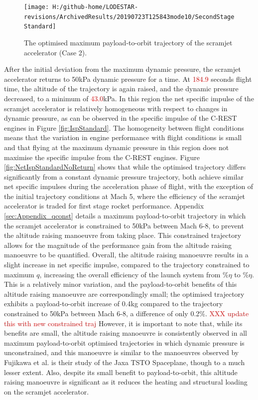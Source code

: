 \begin{figure}[ht!]%
\centering
\texttt{[image: H:/github-home/LODESTAR-revisions/ArchivedResults/20190723T125843mode10/SecondStageStandard]}
\caption{The optimised maximum payload-to-orbit trajectory of the scramjet accelerator (Case 2).}
\label{fig:SecondStageStandardNoReturn}
\end{figure}



After the initial deviation from the maximum dynamic pressure, the scramjet accelerator returns to 50kPa dynamic pressure for a time. 
At \textcolor{red}{184.9} seconds flight time, the altitude of the trajectory is again raised, and the dynamic pressure decreased, to a minimum of \textcolor{red}{43.0}kPa. In this region the net specific impulse of the scramjet accelerator is relatively homogeneous with respect to changes in dynamic pressure, as can be observed in the specific impulse of the C-REST engines in Figure \ref{fig:IspStandard}. The homogeneity between flight conditions means that the variation in engine performance with flight conditions is small and that flying at the maximum dynamic pressure in this region does not maximise the specific impulse from the C-REST engines. Figure \ref{fig:NetIspStandardNoReturn} shows that while the optimised trajectory differs significantly from a constant dynamic pressure trajectory, both achieve similar net specific impulses during the acceleration phase of flight, with the exception of the initial trajectory conditions at Mach 5, where the efficiency of the scramjet accelerator is traded for first stage rocket performance. 
Appendix \ref{sec:Appendix_qconst} details a maximum payload-to-orbit trajectory in which the scramjet accelerator is constrained to 50kPa between Mach 6-8, to prevent the altitude raising manoeuvre from taking place. This constrained trajectory allows for the magnitude of the performance gain from the altitude raising manoeuvre to be quantified. 
Overall, the altitude raising manoeuvre results in a slight increase in net specific impulse, compared to the trajectory constrained to maximum $q$, increasing the overall efficiency of the launch system from \totalExergyEffqconstrainedNoReturn \%$\eta$ to \totalExergyEffStandardNoReturn\%$\eta$. This is a relatively minor variation, and the payload-to-orbit benefits of this altitude raising manoeuvre are correspondingly small; 
the optimised trajectory exhibits a payload-to-orbit increase of 0.4kg compared to the trajectory constrained to 50kPa between Mach 6-8, a difference of only 0.2\%. \textcolor{red}{XXX update this with new constrained traj}
However, it is important to note that, while its benefits are small, the altitude raising manoeuvre is consistently observed in all maximum payload-to-orbit optimised trajectories in which dynamic pressure is unconstrained, and this manoeuvre is similar to the manoeuvres observed by Fujikawa et al.\cite{Fujikawa2017} is their study of the Jaxa TSTO Spaceplane, though to a much lesser extent. 
Also, despite its small benefit to payload-to-orbit, this altitude raising manoeuvre is significant as it reduces the heating and structural loading on the scramjet accelerator. 





